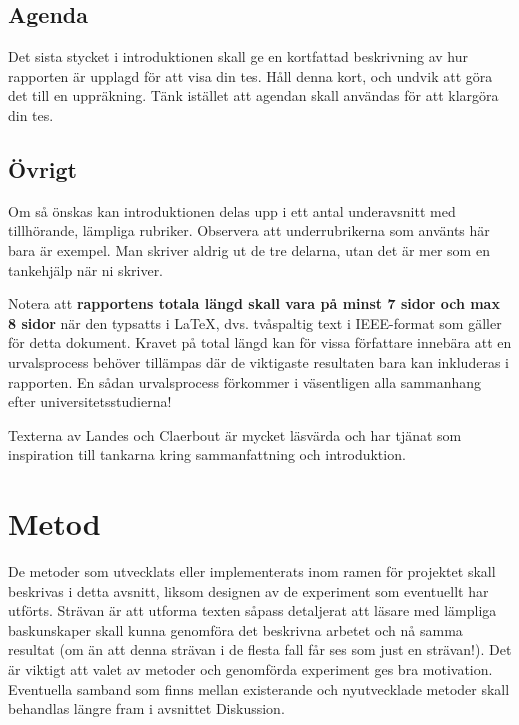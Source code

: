 \documentclass[twoside,twocolumn,9pt,a4paper]{IEEEtran}
\begin{document}
\subsection{Agenda}

Det sista stycket i introduktionen skall ge en kortfattad beskrivning av hur rapporten är upplagd för att visa din tes. Håll denna kort, och undvik att göra det till en uppräkning. Tänk istället att agendan skall användas för att klargöra din tes. 

\subsection{Övrigt}

Om så önskas kan introduktionen delas upp i ett antal underavsnitt med tillhörande, lämpliga rubriker. Observera att underrubrikerna som använts här bara är exempel. Man skriver aldrig ut de tre delarna, utan det är mer som en tankehjälp när ni skriver.

Notera att \textbf{rapportens totala längd skall vara på minst 7 sidor och max 8 sidor} när den typsatts i \LaTeX, dvs. tvåspaltig text i IEEE-format som gäller för detta dokument. Kravet på total längd kan för vissa författare innebära att en urvalsprocess behöver tillämpas där de viktigaste resultaten bara kan inkluderas i rapporten. En sådan urvalsprocess förkommer i väsentligen alla sammanhang efter universitetsstudierna! 

Texterna av Landes \cite{Landes1951} och Claerbout \cite{Claerbout1991} är mycket läsvärda och har tjänat som inspiration till tankarna kring sammanfattning och introduktion.






\section{Metod} \label{secAfibMethods}

De metoder som utvecklats eller implementerats inom ramen för projektet skall beskrivas i detta avsnitt, liksom designen av de experiment som eventuellt har utförts. Strävan är att utforma texten såpass detaljerat att läsare med lämpliga baskunskaper skall kunna genomföra det beskrivna arbetet och nå samma resultat (om än att denna strävan i de flesta fall får ses som just en strävan!). Det är viktigt att valet av metoder och genomförda experiment ges bra motivation. Eventuella samband som finns mellan existerande och nyutvecklade metoder skall behandlas längre fram i avsnittet Diskussion.
\end{document}
